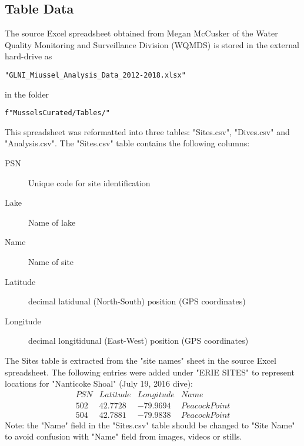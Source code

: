 \documentclass[11pt]{article} %
\begin{document}
\subsection{Table Data}

The source Excel spreadsheet obtained from Megan McCusker of the Water Quality Monitoring and Surveillance Division (WQMDS) is stored in the external hard-drive as
\begin{verbatim}
"GLNI_Miussel_Analysis_Data_2012-2018.xlsx"
\end{verbatim}
in the folder
\begin{verbatim}
f"MusselsCurated/Tables/"
\end{verbatim}

This spreadsheet was reformatted into three tables: "Sites.csv", "Dives.csv" and "Analysis.csv". The "Sites.csv" table contains the following columns:
\begin{description}
\item[PSN] Unique code for site identification
\item[Lake] Name of lake
\item[Name] Name of site
\item[Latitude] decimal latidunal (North-South) position (GPS coordinates)
\item[Longitude] decimal longitidunal (East-West) position (GPS coordinates)
\end{description}
The Sites table is extracted from the "site names" sheet in the source Excel spreadsheet. The following entries were added under "ERIE SITES" to represent locations for "Nanticoke Shoal" (July 19, 2016 dive):
\[
\begin{array}{llll}
PSN & Latitude & Longitude & Name \\
502	& 42.7728 &	-79.9694	& Peacock Point\\
504	& 42.7881 &	-79.9838	& Peacock Point
\end{array}
\]
Note: the "Name" field in the "Sites.csv" table should be changed to "Site Name" to avoid confusion with "Name" field from images, videos or stills.
\end{document}
